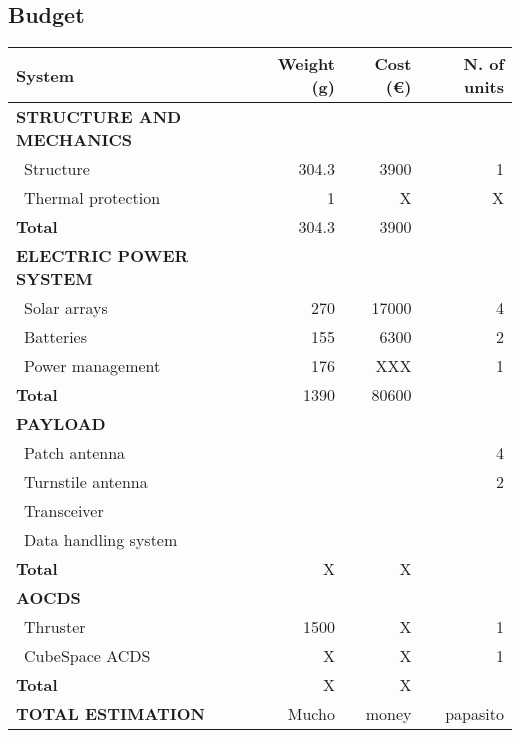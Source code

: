 
\subsection{Budget}

\begin{longtable}{| l | r | r | r |}
\rowcolor[gray]{0.80}	\textbf{System} & \textbf{Weight (g)} & \textbf{Cost (\euro)} & \textbf{N. of units}\\
    \hline
    \endfirsthead


\rowcolor[gray]{0.85} \textbf{STRUCTURE AND MECHANICS} & & & \\

   ~Structure & 304.3 & 3900 & 1 \\
   ~Thermal protection & 1 & X & X\\
   \hline
   \rowcolor[gray]{0.95} \textbf{Total} & 304.3 & 3900 &  \\
   \hline
   
\rowcolor[gray]{0.85} \textbf{ELECTRIC POWER SYSTEM} & & & \\

   ~Solar arrays & 270 & 17000 & 4 \\
   ~Batteries & 155 & 6300 & 2 \\
   ~Power management & 176 & XXX & 1 \\
   \hline
   \rowcolor[gray]{0.95} \textbf{Total} & 1390 & 80600 &  \\
   \hline

\rowcolor[gray]{0.85} \textbf{PAYLOAD} & & & \\

   ~Patch antenna & & & 4 \\
   ~Turnstile antenna & & & 2 \\
   ~Transceiver & & & \\
   ~Data handling system & & &\\
   \hline
   \rowcolor[gray]{0.95} \textbf{Total} & X & X & \\
   \hline
   
\rowcolor[gray]{0.85} \textbf{AOCDS} & & &\\

   ~Thruster & 1500 & X & 1 \\
   ~CubeSpace ACDS & X & X & 1 \\
   \hline
   \rowcolor[gray]{0.95} \textbf{Total} & X & X & \\
   \hline
   
\rowcolor[gray]{0.9} \textbf{TOTAL ESTIMATION} & Mucho& money & papasito\\


\end{longtable} 
